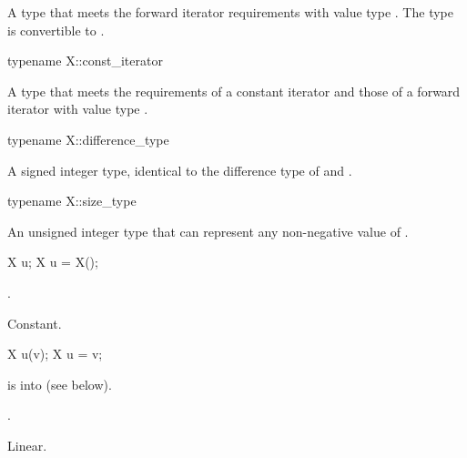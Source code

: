 \begin{itemdescr}
\pnum
\result
A type that meets the forward iterator requirements
with value type .
The type  is convertible to .
\end{itemdescr}

%
\begin{itemdecl}
typename X::const_iterator
\end{itemdecl}

\begin{itemdescr}
\pnum
\result
A type that meets the requirements of a constant iterator and
those of a forward iterator with value type .
\end{itemdescr}

%
\begin{itemdecl}
typename X::difference_type
\end{itemdecl}

\begin{itemdescr}
\pnum
\result
A signed integer type,
identical to the difference type of
 and .
\end{itemdescr}

%
\begin{itemdecl}
typename X::size_type
\end{itemdecl}

\begin{itemdescr}
\pnum
\result
An unsigned integer type
that can represent any non-negative value of .
\end{itemdescr}

\begin{itemdecl}
X u;
X u = X();
\end{itemdecl}

\begin{itemdescr}
\pnum
\ensures
{}.

\pnum
\complexity
Constant.
\end{itemdescr}

\begin{itemdecl}
X u(v);
X u = v;
\end{itemdecl}

\begin{itemdescr}
\pnum
\expects
{} is  into  (see below).

\pnum
\ensures
{}.

\pnum
\complexity
Linear.
\end{itemdescr}

